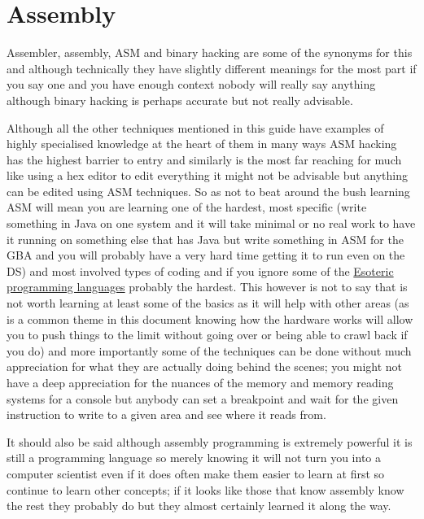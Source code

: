 \documentclass[
]{book}
\begin{document}
\hypertarget{assembly}{%
\section{Assembly}\label{assembly}}

Assembler, assembly, ASM and binary hacking are some of the synonyms for this and although technically they have slightly different meanings for the most part if you say one and you have enough context nobody will really say anything although binary hacking is perhaps accurate but not really advisable.

Although all the other techniques mentioned in this guide have examples of highly specialised knowledge at the heart of them in many ways ASM hacking has the highest barrier to entry and similarly is the most far reaching for much like using a hex editor to edit everything it might not be advisable but anything can be edited using ASM techniques. So as not to beat around the bush learning ASM will mean you are learning one of the hardest, most specific (write something in Java on one system and it will take minimal or no real work to have it running on something else that has Java but write something in ASM for the GBA and you will probably have a very hard time getting it to run even on the DS) and most involved types of coding and if you ignore some of the \href{http://esolangs.org/wiki/Esoteric_programming_language}{Esoteric programming languages} probably the hardest. This however is not to say that is not worth learning at least some of the basics as it will help with other areas (as is a common theme in this document knowing how the hardware works will allow you to push things to the limit without going over or being able to crawl back if you do) and more importantly some of the techniques can be done without much appreciation for what they are actually doing behind the scenes; you might not have a deep appreciation for the nuances of the memory and memory reading systems for a console but anybody can set a breakpoint and wait for the given instruction to write to a given area and see where it reads from.

It should also be said although assembly programming is extremely powerful it is still a programming language so merely knowing it will not turn you into a computer scientist even if it does often make them easier to learn at first so continue to learn other concepts; if it looks like those that know assembly know the rest they probably do but they almost certainly learned it along the way.
\end{document}
